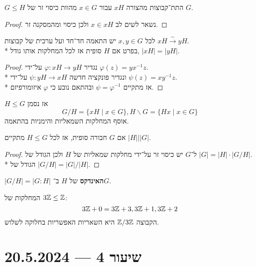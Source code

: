\begin{proposition}[כיסוי זר]
	$G \le H$ התת־קבוצות מהצורה $xH$ עבור $x \in G$ מהוות כיסוי זר של $G$.
\end{proposition}
\begin{proof}
	נשאר לשים לב $x \in xH$ ולכן כיסוי ומהמסקנה זר.
\end{proof}

\begin{proposition}
	לכל $x, y \in G$ יש התאמה חד־חד ועל ערכית של קבוצות $xH \xrightarrow{\sim} yH$. \\*
	בפרט אם $H$ סופית אז לכל המחלקות אותו גודל, $|xH| = |yH|$.
\end{proposition}
\begin{proof}
	נגדיר
	$\varphi : xH \to yH$ על־ידי $\varphi(z) = y x^{-1} z$. \\*
	ונגדיר פונקציה חדשה $\psi : yH \to xH$ על־ידי $\psi(z) = x y^{-1} z$. \\*
	אז מתקיים $\psi = \varphi^{-1}$ ובהתאם נובע כי $\varphi$ איזומורפיזם.
\end{proof}

\begin{definition}
	$H \le G$ אז נסמן
	\[
		G / H = \{ xH \mid x \in G \},
		H \backslash G = \{ Hx \mid x \in G \}
	\]
	אוסף המחלקות השמאליות והימניות בהתאמה.
\end{definition}
\begin{theorem}
	אם $G$ חבורה סופית, אז לכל $H \le G$ מתקיים $\left. |H| \Big| |G| \right. $.
\end{theorem}
\begin{proof}
	ל־$G$ יש כיסוי זר על־ידי מחלקות שמאליות של $H$ ולכן הגודל של $|G| = |H| \cdot |G / H|$. \\*
	הגודל של $|G / H| = |G| / |H|$.
\end{proof}
\begin{notation}
	$|G / H| = |G : H|$ \textbf{האינדקס} של $H$ ב־$G$.
\end{notation}

\begin{example}
	המחלקות של $3\mathbb{Z} \le \mathbb{Z}$:
	\[
		3\mathbb{Z} + 0 = 3\mathbb{Z} + 3, 3\mathbb{Z} + 1, 3\mathbb{Z} + 2
	\]
	הקבוצה $\mathbb{Z}/3\mathbb{Z}$ היא השאריות האפשריות בחלוקה לשלוש.
\end{example}

\section{שיעור 4 --- 20.5.2024}
